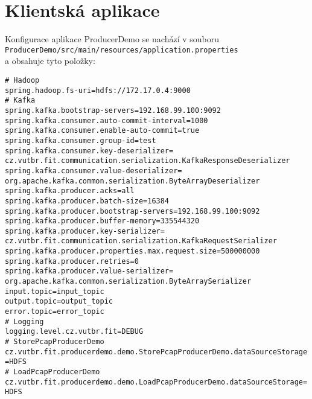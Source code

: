 \section{Klientská aplikace}
Konfigurace aplikace ProducerDemo se nachází v souboru \\
\texttt{ProducerDemo/src/main/resources/application.properties} \\
a obsahuje tyto položky:

\vspace{0.5cm}
\noindent \texttt{\#   Hadoop \\
spring.hadoop.fs-uri=hdfs://172.17.0.4:9000 \\
\#   Kafka \\
spring.kafka.bootstrap-servers=192.168.99.100:9092 \\
spring.kafka.consumer.auto-commit-interval=1000 \\
spring.kafka.consumer.enable-auto-commit=true \\
spring.kafka.consumer.group-id=test \\
spring.kafka.consumer.key-deserializer= \\
\indent cz.vutbr.fit.communication.serialization.KafkaResponseDeserializer \\
spring.kafka.consumer.value-deserializer= \\
\indent org.apache.kafka.common.serialization.ByteArrayDeserializer \\
spring.kafka.producer.acks=all \\
spring.kafka.producer.batch-size=16384 \\
spring.kafka.producer.bootstrap-servers=192.168.99.100:9092 \\
spring.kafka.producer.buffer-memory=335544320 \\
spring.kafka.producer.key-serializer= \\
\indent cz.vutbr.fit.communication.serialization.KafkaRequestSerializer \\
spring.kafka.producer.properties.max.request.size=500000000 \\
spring.kafka.producer.retries=0 \\
spring.kafka.producer.value-serializer= \\
\indent org.apache.kafka.common.serialization.ByteArraySerializer \\
input.topic=input\_topic \\
output.topic=output\_topic \\
error.topic=error\_topic \\
\#   Logging \\
logging.level.cz.vutbr.fit=DEBUG \\
\#   StorePcapProducerDemo \\
cz.vutbr.fit.producerdemo.demo.StorePcapProducerDemo.dataSourceStorage=HDFS \\
\#   LoadPcapProducerDemo \\
cz.vutbr.fit.producerdemo.demo.LoadPcapProducerDemo.dataSourceStorage=HDFS
}


